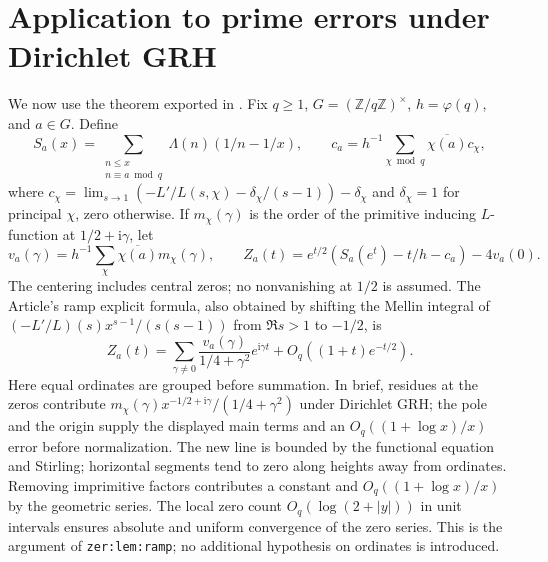 \documentclass[11pt]{article}
\theoremstyle{remark}\newtheorem{remark}[theorem]{Remark}
\newcommand{\ii}{\mathrm i}
\begin{document}
\section{Application to prime errors under Dirichlet GRH}\label{sec:prime}
We now use the theorem exported in . Fix $q\ge1$, $G=(\mathbb Z/q\mathbb Z)^\times$, $h=\varphi(q)$, and $a\in G$. Define
\[
 S_a(x)=\sum_{\substack{n\le x\\n\equiv a\bmod q}}\Lambda(n)(1/n-1/x),\qquad
 c_a=h^{-1}\sum_{\chi\bmod q}\overline{\chi(a)}c_\chi,
\]
where $c_\chi=\lim_{s\to1}(-L'/L(s,\chi)-\delta_\chi/(s-1))-\delta_\chi$ and $\delta_\chi=1$ for principal $\chi$, zero otherwise. If $m_\chi(\gamma)$ is the order of the primitive inducing $L$-function at $1/2+\ii\gamma$, let
\[
 v_a(\gamma)=h^{-1}\sum_\chi\overline{\chi(a)}m_\chi(\gamma),\qquad
 Z_a(t)=e^{t/2}(S_a(e^t)-t/h-c_a)-4v_a(0).
\]
The centering includes central zeros; no nonvanishing at $1/2$ is assumed. The Article's ramp explicit formula, also obtained by shifting the Mellin integral of $(-L'/L)(s)x^{s-1}/(s(s-1))$ from $\Re s>1$ to $-1/2$, is
\begin{equation}\label{eq:ramp}
 Z_a(t)=\sum_{\gamma\ne0}\frac{v_a(\gamma)}{1/4+\gamma^2}e^{\ii\gamma t}+O_q((1+t)e^{-t/2}).
\end{equation}
Here equal ordinates are grouped before summation. In brief, residues at the zeros contribute $m_\chi(\gamma)x^{-1/2+\ii\gamma}/(1/4+\gamma^2)$ under Dirichlet GRH; the pole and the origin supply the displayed main terms and an $O_q((1+\log x)/x)$ error before normalization. The new line is bounded by the functional equation and Stirling; horizontal segments tend to zero along heights away from ordinates. Removing imprimitive factors contributes a constant and $O_q((1+\log x)/x)$ by the geometric series. The local zero count $O_q(\log(2+|y|))$ in unit intervals ensures absolute and uniform convergence of the zero series. This is the argument of \texttt{zer:lem:ramp}; no additional hypothesis on ordinates is introduced.
\end{document}
